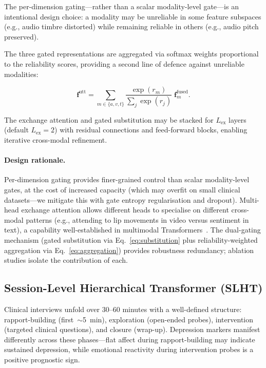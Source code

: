 \documentclass{article}
\begin{document}
The per-dimension gating---rather than a scalar modality-level gate---is an intentional
design choice: a modality may be unreliable in some feature subspaces (e.g., audio timbre
distorted) while remaining reliable in others (e.g., audio pitch preserved).

The three gated representations are aggregated via softmax weights proportional to the
reliability scores, providing a second line of defence against unreliable modalities:

\begin{equation}
  \mathbf{f}^{\text{utt}} = \sum_{m \in \{a,v,t\}}
    \frac{\exp(r_m)}{\sum_{j}\exp(r_j)} \; \mathbf{f}_m^{\text{fused}}.
  \label{eq:aggregation}
\end{equation}

The exchange attention and gated substitution may be stacked for $L_{\text{ex}}$ layers
(default $L_{\text{ex}} = 2$) with residual connections and feed-forward blocks,
enabling iterative cross-modal refinement.

\paragraph{Design rationale.}
Per-dimension gating provides finer-grained control than scalar modality-level gates,
at the cost of increased capacity (which may overfit on small clinical datasets---we
mitigate this with gate entropy regularisation and dropout). Multi-head exchange
attention allows different heads to specialise on different cross-modal patterns
(e.g., attending to lip movements in video versus sentiment in text), a capability
well-established in multimodal Transformers~\cite{tsai2019mult}. The dual-gating
mechanism (gated substitution via Eq.~\ref{eq:substitution} plus reliability-weighted
aggregation via Eq.~\ref{eq:aggregation}) provides robustness redundancy; ablation
studies isolate the contribution of each.

\subsection{Session-Level Hierarchical Transformer (SLHT)}

Clinical interviews unfold over 30--60 minutes with a well-defined structure: rapport-building
(first~$\sim$5~min), exploration (open-ended probes), intervention (targeted clinical
questions), and closure (wrap-up). Depression markers manifest differently across these
phases---flat affect during rapport-building may indicate sustained depression, while
emotional reactivity during intervention probes is a positive prognostic sign.
\end{document}
